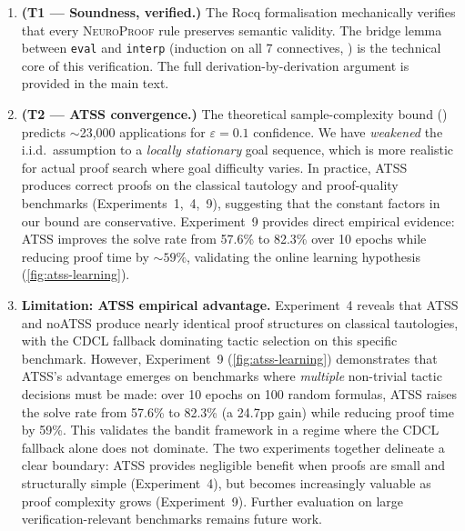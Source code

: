 \documentclass[conference]{IEEEtran}
\newcommand{\NP}{\textsc{NeuroProof}}
\begin{document}
\begin{enumerate}
  \item \textbf{(T1 --- Soundness, verified.)}  The Rocq
    formalisation mechanically verifies that every \NP{} rule
    preserves semantic validity.  The bridge lemma between
    \texttt{eval} and \texttt{interp} (induction on all 7
    connectives, ) is the technical core of
    this verification.  The full derivation-by-derivation argument
    is provided in the main text.

  \item \textbf{(T2 --- ATSS convergence.)}  The theoretical
    sample-complexity bound () predicts
    $\sim$23{,}000 applications for $\varepsilon=0.1$ confidence.
    We have \emph{weakened} the i.i.d.\ assumption to a
    \emph{locally stationary} goal sequence, which is more realistic
    for actual proof search where goal difficulty varies.  In practice,
    ATSS produces correct proofs on the classical tautology
    and proof-quality benchmarks (Experiments~1,~4,~9), suggesting that
    the constant factors in our bound are conservative.
    Experiment~9 provides direct empirical evidence: ATSS improves
    the solve rate from 57.6\% to 82.3\% over 10 epochs while
    reducing proof time by ${\sim}59\%$, validating the online
    learning hypothesis (\cref{fig:atss-learning}).

  \item \textbf{Limitation: ATSS empirical advantage.}
    Experiment~4 reveals that ATSS and noATSS produce nearly identical
    proof structures on classical tautologies, with the CDCL fallback
    dominating tactic selection on this specific benchmark.
    However, Experiment~9 (\cref{fig:atss-learning}) demonstrates
    that ATSS's advantage emerges on benchmarks where \emph{multiple}
    non-trivial tactic decisions must be made: over 10 epochs on
    100 random formulas, ATSS raises the solve rate from 57.6\%
    to 82.3\% (a 24.7pp gain) while reducing proof time by 59\%.
    This validates the bandit framework in a regime where the
    CDCL fallback alone does not dominate.  The two experiments
    together delineate a clear boundary: ATSS provides negligible
    benefit when proofs are small and structurally simple
    (Experiment~4), but becomes increasingly valuable as
    proof complexity grows (Experiment~9).  Further evaluation
    on large verification-relevant benchmarks remains future work.


\end{enumerate}
\end{document}
